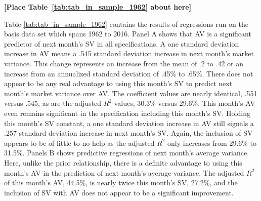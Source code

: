 \bigskip
\centerline{\bf [Place Table~\ref{tab:tab_in_sample_1962} about here]}
\bigskip

Table \ref{tab:tab_in_sample_1962} contains the results of regressions run on the basis data set which spans 1962 to 2016. Panel A shows that AV is a significant predictor of next month’s SV in all specifications. A one standard deviation increase in AV means a .545 standard deviation increase in next month’s market variance. This change represents an increase from the mean of .2 to .42 or an increase from an annualized standard deviation of  .45\% to .65\%. There does not appear to be any real advantage to using this month’s SV to predict next month’s market variance over AV. The coefficient values are nearly identical, .551 versus .545, as are the adjusted $R^{2}$ values, 30.3\% versus 29.6\%. This month’s AV even remains significant in the specification including this month’s SV. Holding this month’s SV constant, a one standard deviation increase in AV still signals a .257 standard deviation increase in next month’s SV. Again, the inclusion of SV appears to be of little to no help as the adjusted $R^{2}$ only increases from 29.6\% to 31.5\%. Panels B shows predictive regressions of next month’s average variance. Here, unlike the prior relationship, there is a definite advantage to using this month’s AV in the prediction of next month’s average variance. The adjusted $R^{2}$ of this month's AV, 44.5\%, is nearly twice this month's SV, 27.2\%, and the inclusion of SV with AV does not appear to be a significant improvement.

